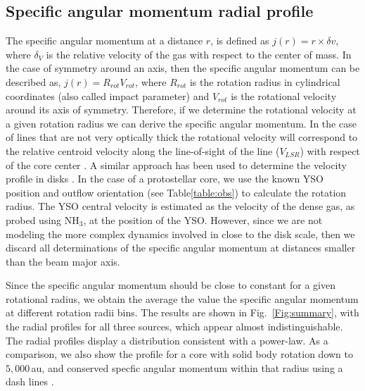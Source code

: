 \subsection{Specific angular momentum radial profile}
The specific angular momentum at a distance $r$, is defined as $j(r)=r \times \delta v$, 
where $\delta_V$ is the relative velocity of the gas with respect to the center of mass. 
%
In the case of symmetry around an axis, then the specific angular momentum can be described as, 
$j(r) = R_{rot} V_{rot}$, 
where $R_{rot}$ is the rotation radius in cylindrical coordinates (also called impact parameter) and 
$V_{rot}$ is the rotational velocity around its axis of symmetry.
Therefore, if we determine the rotational velocity at a given rotation radius we can 
derive the specific angular momentum. 
In the case of lines that are not very optically thick the rotational velocity will correspond to the 
relative centroid velocity along the line-of-sight of the line ($V_{LSR}$) with 
respect of the core center \citep{Tanner_2010}. 
A similar approach has been used to determine the velocity profile in disks \citep{Murillo_2013,2014A&A...566A..74L,Harsono_2014,Harsono_2015}.
%
In the case of a protostellar core, we use the known YSO position and outflow orientation (see Table\ref{table:obs}) 
to calculate the rotation radius.
The YSO central velocity is estimated as the velocity of the dense gas, as probed using NH$_3$, 
at the position of the YSO.
However, since we are not modeling the more complex dynamics involved in close to the disk scale, then 
we discard all determinations of the specific angular momentum at distances smaller than the beam major axis.

Since the specific angular momentum should be close to constant for a given rotational radius, 
we obtain the average the value the specific angular momentum at different rotation radii bins.
The results are shown in Fig.~\ref{Fig:summary}, with the radial profiles for all three sources, 
which appear almost indistinguishable.
The radial profiles display a distribution consistent with a power-law. 
As a comparison, we also show the profile for a core with solid body rotation down to $5,000$\,au, 
and conserved specfic angular momentum within that radius using a dash lines \citep{Belloche_2013}. 